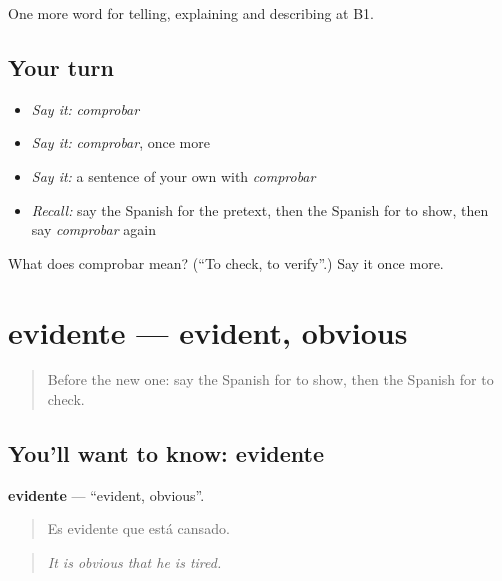 \begin{grammarlens}[title={What you've built}]
One more word for telling, explaining and describing at B1.
\end{grammarlens}

\subsection*{Your turn}
\begin{itemize}
\raggedright
  \item \emph{Say it:} \emph{comprobar}
  \item \emph{Say it:} \emph{comprobar}, once more
  \item \emph{Say it:} a sentence of your own with \emph{comprobar}
  \item \emph{Recall:} say the Spanish for the pretext, then the Spanish for to show, then say \emph{comprobar} again
\end{itemize}

\begin{tcolorbox}[breakable,colback=teal!4,colframe=teal!35!black,title={Before you move on}]
What does comprobar mean? (\textquotedblleft{}To check, to verify\textquotedblright{}.) Say it once more.
\end{tcolorbox}
\section[evidente]{evidente — evident, obvious}

\label{lesson:ES-C587-evidente}



\begin{quote}
Before the new one: say the Spanish for to show, then the Spanish for to check.
\end{quote}

\subsection*{You'll want to know: evidente}
\textbf{evidente} — \textquotedblleft{}evident, obvious\textquotedblright{}.

\begin{quote}
Es evidente que está cansado.
\end{quote}

\begin{quote}
\emph{It is obvious that he is tired.}
\end{quote}

